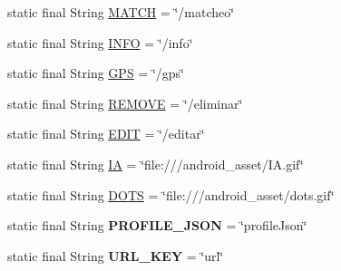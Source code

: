 \begin{DoxyCompactItemize}
\item 
static final String \hyperlink{classcom_1_1example_1_1sebastian_1_1tindertp_1_1commonTools_1_1Common_a28fde071b3faf6ab868ef469ed66cb70}{M\+A\+T\+CH} = \char`\"{}/matcheo\char`\"{}
\item 
static final String \hyperlink{classcom_1_1example_1_1sebastian_1_1tindertp_1_1commonTools_1_1Common_a415909b836ea7079008f081e482ad1a5}{I\+N\+FO} = \char`\"{}/info\char`\"{}
\item 
static final String \hyperlink{classcom_1_1example_1_1sebastian_1_1tindertp_1_1commonTools_1_1Common_a6b409e03c3a58eeff3ba5f7001b7f17d}{G\+PS} = \char`\"{}/gps\char`\"{}
\item 
static final String \hyperlink{classcom_1_1example_1_1sebastian_1_1tindertp_1_1commonTools_1_1Common_aae0c3e1d895c90e3e6daf8346012200f}{R\+E\+M\+O\+VE} = \char`\"{}/eliminar\char`\"{}
\item 
static final String \hyperlink{classcom_1_1example_1_1sebastian_1_1tindertp_1_1commonTools_1_1Common_a55102a3c9815bdf347b4d124d0e52a76}{E\+D\+IT} = \char`\"{}/editar\char`\"{}
\item 
static final String \hyperlink{classcom_1_1example_1_1sebastian_1_1tindertp_1_1commonTools_1_1Common_aae5ecea5aa3915aa216f04a10f1d6074}{IA} = \char`\"{}file\+:///android\+\_\+asset/I\+A.\+gif\char`\"{}
\item 
static final String \hyperlink{classcom_1_1example_1_1sebastian_1_1tindertp_1_1commonTools_1_1Common_af9ff2dd415fc9361e082cf3877c8c635}{D\+O\+TS} = \char`\"{}file\+:///android\+\_\+asset/dots.\+gif\char`\"{}
\item 
static final String {\bfseries P\+R\+O\+F\+I\+L\+E\+\_\+\+J\+S\+ON} = \char`\"{}profile\+Json\char`\"{}\hypertarget{classcom_1_1example_1_1sebastian_1_1tindertp_1_1commonTools_1_1Common_a2d70e4f1b3e6b5876072315847f46fcb}{}\label{classcom_1_1example_1_1sebastian_1_1tindertp_1_1commonTools_1_1Common_a2d70e4f1b3e6b5876072315847f46fcb}

\item 
static final String {\bfseries U\+R\+L\+\_\+\+K\+EY} = \char`\"{}url\char`\"{}\hypertarget{classcom_1_1example_1_1sebastian_1_1tindertp_1_1commonTools_1_1Common_a55021db0efa3887ab7fb69950534c8da}{}\label{classcom_1_1example_1_1sebastian_1_1tindertp_1_1commonTools_1_1Common_a55021db0efa3887ab7fb69950534c8da}


\end{DoxyCompactItemize}

